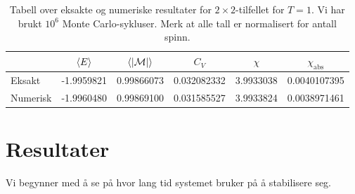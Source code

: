 \documentclass[11pt]{article}
\newcommand{\abs}[1]{|#1|}
\begin{document}
\begin{table}
\centering
\caption{Tabell over eksakte og numeriske resultater for $2\times
  2$-tilfellet for $T=1$. Vi har brukt $10^6$ Monte Carlo-sykluser. Merk at
alle tall er normalisert for antall spinn.}
\label{tab:2x2-eksakt-num}
\vspace{0.5cm}
\begin{tabular}{l|ccccc}
 & $\langle E \rangle$ & $\mean{ \abs{\mathcal{M} } }$ & $C_V$ & $\chi$ & $\chi_\text{abs}$ \\
\hline
Eksakt & -1.9959821 & 0.99866073 & 0.032082332 & 3.9933038 & 0.0040107395 \\
Numerisk & -1.9960480 & 0.99869100 & 0.031585527 & 3.9933824 & 0.0038971461 
\end{tabular}

\end{table}




\section{Resultater}

Vi begynner med å se på hvor lang tid systemet bruker på å stabilisere seg. 
\end{document}
